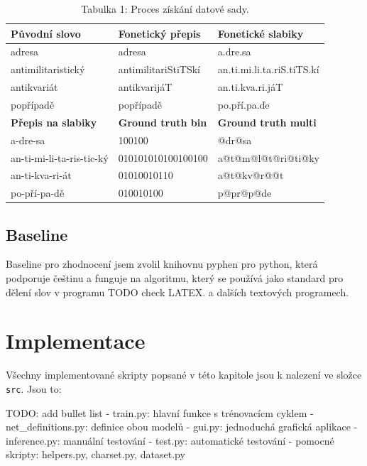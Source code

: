 \documentclass[a4paper]{article}
\theoremstyle{definition}
\begin{document}
\begin{table}[]
\centering
\caption{Tabulka 1: Proces získání datové sady.}
\begin{tabular}{|l|l|l|}
\hline
\textbf{Původní slovo}     & \textbf{Fonetický přepis}    & \textbf{Fonetické slabiky} \\ \hline
adresa                     & adresa                       & a.dre.sa                   \\ \hline
antimilitaristický         & antimilitariStiTSkí          & an.ti.mi.li.ta.riS.tiTS.kí \\ \hline
antikvariát                & antikvarijáT                 & an.ti.kva.ri.jáT           \\ \hline
popřípadě                  & popřípadě                    & po.pří.pa.ďe               \\ \hline
\textbf{Přepis na slabiky} & \textbf{Ground truth bin}    & \textbf{Ground truth multi}      \\ \hline
a-dre-sa                   & 100100                       & @dr@sa                     \\ \hline
an-ti-mi-li-ta-ris-tic-ký  & 010101010100100100           & a@t@m@l@t@ri@ti@ky         \\ \hline
an-ti-kva-ri-át            & 01010010110                  & a@t@kv@r@@t                \\ \hline
po-pří-pa-dě               & 010010100                    & p@pr@p@de                  \\ \hline
\end{tabular}
\label{table:dataset}
\end{table}

\subsection{Baseline}

Baseline pro zhodnocení jsem zvolil knihovnu pyphen pro python, která podporuje češtinu a funguje na algoritmu, který se používá jako standard pro dělení slov v programu \Latex{} TODO check LATEX. a dalších textových programech.

\section{Implementace}
Všechny implementované skripty popsané v této kapitole jsou k nalezení ve složce \texttt{src}. Jsou to:

TODO: add bullet list
 - train.py: hlavní funkce s trénovacícm cyklem
 - net_definitions.py: definice obou modelů
 - gui.py: jednoduchá grafická aplikace
 - inference.py: manuální testování
 - test.py: automatické testování
 - pomocné skripty: helpers.py, charset.py, dataset.py
\end{document}

